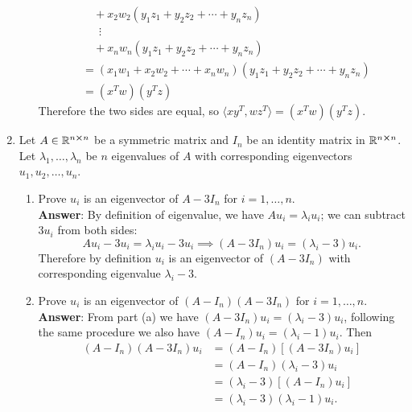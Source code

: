 \documentclass{article}
\begin{document}
\begin{enumerate}
\begin{enumerate}
\begin{align*}
                                                 & \quad+x_2w_2(y_1z_1+y_2z_2+\cdots+y_nz_n)                          \\
                                                 & \quad\;\:\vdots                                                    \\
                                                 & \quad+x_nw_n(y_1z_1+y_2z_2+\cdots+y_nz_n)                          \\
                                                 & =(x_1w_1+x_2w_2+\cdots+x_nw_n)(y_1z_1+y_2z_2+\cdots+y_nz_n)        \\
                                                 & =(x^Tw)(y^Tz)
                    \end{align*}
                    Therefore the two sides are equal, so $\langle xy^T,wz^T\rangle=(x^Tw)(y^Tz)$.
          \end{enumerate}
          \newpage
    \item Let $A\in\mathbb{R}^{n\cross n}$ be a symmetric matrix and $I_n$ be an identity matrix in $\mathbb{R}^{n\cross n}$. Let $\lambda_1,\ldots,\lambda_n$ be $n$ eigenvalues of $A$ with corresponding eigenvectors $u_1,u_2,\ldots,u_n$.
          \begin{enumerate}
              \item Prove $u_i$ is an eigenvector of $A-3I_n$ for $i=1,\ldots,n$.\\
                    \textbf{Answer}: By definition of eigenvalue, we have $Au_i=\lambda_iu_i$; we can subtract $3u_i$ from both sides: \[Au_i-3u_i=\lambda_iu_i-3u_i\implies(A-3I_n)u_i=(\lambda_i-3)u_i.\] Therefore by definition $u_i$ is an eigenvector of $(A-3I_n)$ with corresponding eigenvalue $\lambda_i-3$.
              \item Prove $u_i$ is an eigenvector of $(A-I_n)(A-3I_n)$ for $i=1,\ldots,n$.\\
                    \textbf{Answer}: From part (a) we have $(A-3I_n)u_i=(\lambda_i-3)u_i$, following the same procedure we also have $(A-I_n)u_i=(\lambda_i-1)u_i$. Then \begin{align*}
                        (A-I_n)(A-3I_n)u_i & =(A-I_n)[(A-3I_n)u_i]           \\
                                           & =(A-I_n)(\lambda_i-3)u_i        \\
                                           & =(\lambda_i-3)[(A-I_n)u_i]      \\
                                           & =(\lambda_i-3)(\lambda_i-1)u_i.

\end{align*}
\end{enumerate}
\end{enumerate}
\end{document}
